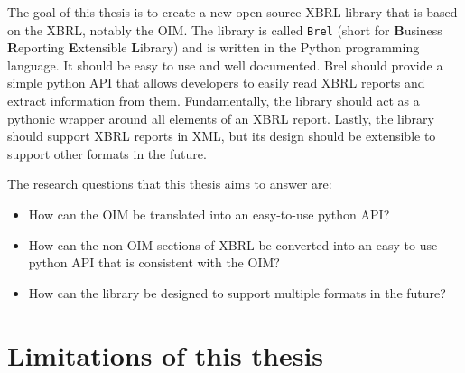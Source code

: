 The goal of this thesis is to create a new open source XBRL library that is based on the XBRL, notably the OIM.
The library is called \texttt{Brel} (short for \textbf{B}usiness \textbf{R}eporting \textbf{E}xtensible \textbf{L}ibrary) and is written in the Python programming language.
It should be easy to use and well documented.
Brel should provide a simple python API that allows developers to easily read XBRL reports and extract information from them.
Fundamentally, the library should act as a pythonic wrapper around all elements of an XBRL report.
Lastly, the library should support XBRL reports in XML, but its design should be extensible to support other formats in the future.

The research questions that this thesis aims to answer are:

\begin{itemize}
    \item How can the OIM be translated into an easy-to-use python API?\label{itm:research_question_1}
    \item How can the non-OIM sections of XBRL be converted into an easy-to-use python API that is consistent with the OIM?\label{itm:research_question_2}
    \item How can the library be designed to support multiple formats in the future?\label{itm:research_question_3}
\end{itemize}

\section{Limitations of this thesis}

